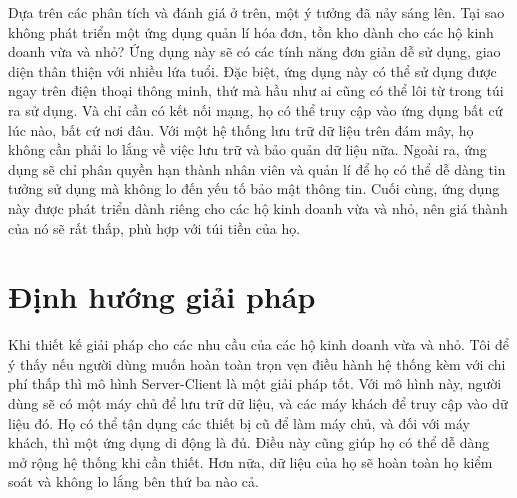 \documentclass[../DoAn.tex]{subfiles}
\begin{document}
Dựa trên các phân tích và đánh giá ở trên, một ý tưởng đã nảy sáng lên. Tại sao không phát triển một ứng dụng quản lí hóa đơn, tồn kho dành cho các hộ kinh doanh vừa và nhỏ? Ứng dụng này sẽ có các tính năng đơn giản dễ sử dụng, giao diện thân thiện với nhiều lứa tuổi. Đặc biệt, ứng dụng này có thể sử dụng được ngay trên điện thoại thông minh, thứ mà hầu như ai cũng có thể lôi từ trong túi ra sử dụng. Và chỉ cần có kết nối mạng, họ có thể truy cập vào ứng dụng bất cứ lúc nào, bất cứ nơi đâu. Với một hệ thống lưu trữ dữ liệu trên đám mây, họ không cần phải lo lắng về việc lưu trữ và bảo quản dữ liệu nữa. Ngoài ra, ứng dụng sẽ chỉ phân quyền hạn thành nhân viên và quản lí để họ có thể dễ dàng tin tưởng sử dụng mà không lo đến yếu tố bảo mật thông tin. Cuối cùng, ứng dụng này được phát triển dành riêng cho các hộ kinh doanh vừa và nhỏ, nên giá thành của nó sẽ rất thấp, phù hợp với túi tiền của họ.
\vfill
\break


\section{Định hướng giải pháp}
\label{section:1.3}

Khi thiết kế giải pháp cho các nhu cầu của các hộ kinh doanh vừa và nhỏ. Tôi để ý thấy nếu người dùng muốn hoàn toàn trọn vẹn điều hành hệ thống kèm với chi phí thấp thì mô hình Server-Client là một giải pháp tốt. Với mô hình này, người dùng sẽ có một máy chủ để lưu trữ dữ liệu, và các máy khách để truy cập vào dữ liệu đó. Họ có thể tận dụng các thiết bị cũ để làm máy chủ, và đối với máy khách, thì một ứng dụng di động là đủ. Điều này cũng giúp họ có thể dễ dàng mở rộng hệ thống khi cần thiết. Hơn nữa, dữ liệu của họ sẽ hoàn toàn họ kiểm soát và không lo lắng bên thứ ba nào cả.
\end{document}
